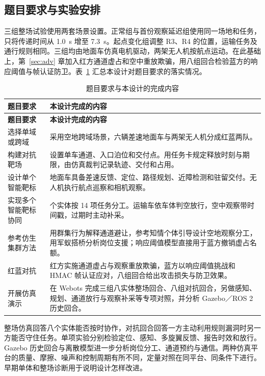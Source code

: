 \subsection{题目要求与实验安排}\label{sec:1.4}

三组整场试验使用两套场景设置。正常组与首份观察延迟组使用同一场地和任务，只将传递时间从 1.0~s 增至 7.3~s。起点变化组调整 R3、R4 的位置，运输任务及通行规则相同。三组均由地面车仿真电机驱动，两架无人机按航点运动。在此基础上，第~\ref{sec:adv} 章加入红方通道虚占和空中重放欺骗，用八组回合检验蓝方的响应阈值与帧认证防卫。表~\ref{tab:4} 汇总本设计对题目要求的落实情况。

\clearpage

\begingroup\small
\setlength{\tableavailable}{\dimexpr\linewidth-2\tabcolsep\relax}
\begin{longtable}{@{}>{\raggedright\arraybackslash}p{0.30\tableavailable}>{\raggedright\arraybackslash}p{0.70\tableavailable}@{}}
\caption{题目要求与本设计的完成内容}\label{tab:4}\\
\toprule
\textbf{题目要求} & \textbf{本设计完成的内容} \\
\midrule
\endfirsthead
\toprule
\textbf{题目要求} & \textbf{本设计完成的内容} \\
\midrule
\endhead
\bottomrule
\endlastfoot
选择单域或跨域 & 采用空地跨域场景，六辆差速地面车与两架无人机分成红蓝两队。\\
构建对抗靶场 & 设置单车通道、入口泊位和交付点。用任务卡规定释放时刻与期限，由仿真裁判记录轨迹、交付和占用。\\
设计单个智能靶标 & 地面车具备差速反馈、定位、路径规划、近障检测和驻留交付。无人机执行航点巡察和相机观察。\\
实现多个智能靶标协同 & 8 个实体按 14 项任务分工。运输车依车体判空放行，空中观察带时间戳，过期时主动补采。\\
参考仿生集群方法 & 用群集行为解释通道避让，参考知情个体引导设计空地观察分工，用军蚁搭桥分析岗位支援；响应阈值模型直接用于蓝方撤销虚占名额。\\
红蓝对抗 & 红方实施通道虚占与观察重放欺骗，蓝方以响应阈值挑战和 HMAC 帧认证应对，八组回合给出攻击损失与防卫效果。\\
开展仿真演示 & 在 Webots 完成三组八实体整场回合、八组对抗回合，另做感知、规划、通道放行与观察补采等专项对照，并分析 Gazebo／ROS 2 历史回合。\\
\end{longtable}
\endgroup


整场仿真回答八个实体能否按时协作，对抗回合回答一方主动利用规则漏洞时另一方能否守住任务。单项实验分别检验定位、感知、多旋翼反馈、报告时效和放行。Gazebo 历史回合与离散模型进一步分析岗位分工、通道预约与通信。两种仿真平台的质量、摩擦、噪声和控制周期有所不同，定量对照在同平台、同条件下进行。早期单体和整场诊断用于说明设计怎样改进。

